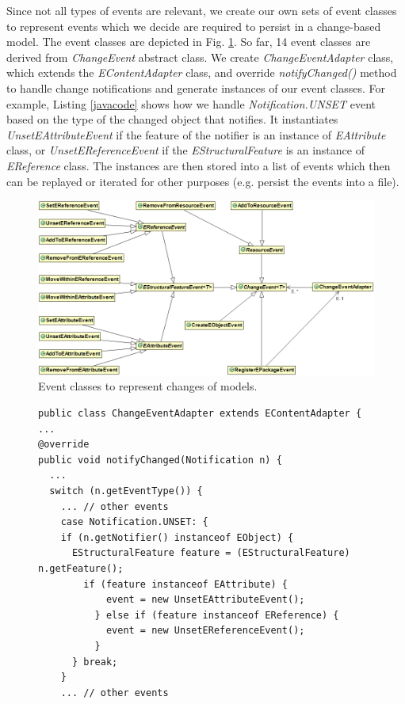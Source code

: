 \documentclass{llncs}
\begin{document}
Since not all types of events are relevant, we create our own sets of event classes to represent events which we decide are required to persist in a change-based model. The event classes are depicted in Fig. \ref{events}. So far, 14 event classes are derived from \emph{ChangeEvent} abstract class. We create \emph{ChangeEventAdapter} class, which extends the \emph{EContentAdapter} class, and override \emph{notifyChanged()} method to handle change notifications and generate instances of our event classes. For example, Listing \ref{javacode} shows how we handle \emph{Notification.UNSET} event based on the type of the changed object that notifies. It instantiates \emph{UnsetEAttributeEvent} if the feature of the notifier is an instance of \emph{EAttribute} class, or \emph{UnsetEReferenceEvent}  if the \emph{EStructuralFeature} is an instance of \emph{EReference} class. The instances are then stored into a list of events which then can be replayed or iterated for other purposes (e.g. persist the events into a file). 

\begin{figure}[t!]
\centering
\includegraphics[width=\linewidth]{events}
\caption{Event classes to represent changes of models.}
\label{events}
\end{figure}

\begin{figure}[t!]
\begin{lstlisting}[style=java,caption={Simplified Java code to handle notification events.},label=javacode]
public class ChangeEventAdapter extends EContentAdapter {
...
@override
public void notifyChanged(Notification n) {
  ...
  switch (n.getEventType()) {
    ... // other events
    case Notification.UNSET: {
    if (n.getNotifier() instanceof EObject) {
      EStructuralFeature feature = (EStructuralFeature) n.getFeature();
        if (feature instanceof EAttribute) {
            event = new UnsetEAttributeEvent();
          } else if (feature instanceof EReference) {
            event = new UnsetEReferenceEvent();
          }
      } break;
    } 
    ... // other events
\end{lstlisting}	
\end{figure}
\end{document}
